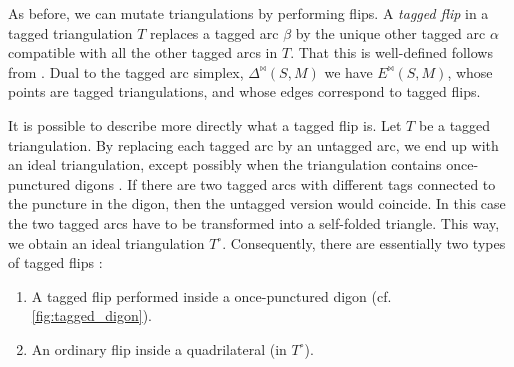 As before, we can mutate triangulations by performing flips. A \emph{tagged
	flip} in a tagged triangulation $T$ replaces a tagged
arc $\beta$ by the unique other tagged arc $\alpha$ compatible with all the other
tagged arcs in $T$. That this is well-defined follows from \cite[Theorem
	7.9]{FominShapiroThurston2008CATriangulatedSurfacesI}. Dual to the tagged arc simplex,
$\Delta^{\bowtie}(S,M)$ we have $E^{\bowtie}(S, M)$, whose points are tagged triangulations, and whose edges correspond to tagged
flips.

It is possible to describe more directly what a tagged flip is. Let $T$ be a tagged
triangulation. By replacing each tagged arc by an untagged arc, we end up with an ideal
triangulation, except possibly when the triangulation contains once-punctured digons \parencite[Remark 7.6]{FominShapiroThurston2008CATriangulatedSurfacesI}. If there are two
tagged arcs with different tags connected to the puncture in the digon, then the
untagged version would coincide. In this case the two tagged arcs have to be
transformed into a self-folded triangle. This way, we obtain an ideal triangulation
$T^\circ$. Consequently, there are essentially two types of tagged flips \cite[Remark
	5.13]{FominThurston2018CATriangulatedSurfacesII}:
\begin{enumerate}
	\item A tagged flip performed inside a once-punctured digon (cf. \cref{fig:tagged_digon}).
	\item An ordinary flip inside a quadrilateral (in $T^\circ$).
\end{enumerate}

